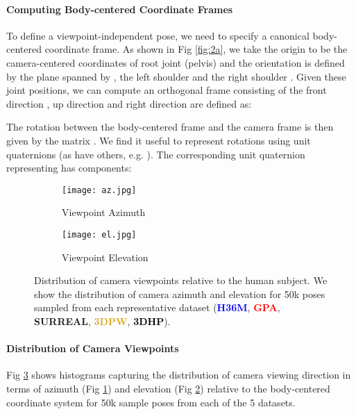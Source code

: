 \documentclass[runningheads]{llncs}
\begin{document}
\paragraph{Computing Body-centered Coordinate Frames}
To define a
viewpoint-independent pose, we need to specify a canonical body-centered
coordinate frame. As shown in Fig \ref{fig:2a}, we take the origin to be the 
camera-centered coordinates of root joint (pelvis)  and
the orientation is defined by the plane spanned by , the left shoulder
 and the right shoulder . Given these joint positions, we can compute
an orthogonal frame consisting of the front direction , up direction  and
right direction  are defined as:

The rotation between the body-centered frame and the camera frame is then given
by the matrix . We find it useful to represent rotations using
unit quaternions (as have others, e.g.
\cite{motionretarget,factored3dTulsiani17}). The corresponding unit quaternion
representing  has components:






\begin{figure}[t]
\begin{center}
\begin{subfigure}{0.48\textwidth}
\texttt{[image: az.jpg]}
\caption{Viewpoint Azimuth} \label{fig:az}
\end{subfigure}
\hspace*{\fill}
\begin{subfigure}{0.48\textwidth} \centering
\texttt{[image: el.jpg]}
\caption{Viewpoint Elevation} \label{fig:el}
\end{subfigure}
\end{center}
   \caption{
   Distribution of camera viewpoints relative to the human subject. 
   We show the distribution of camera azimuth  and
   elevation  for 50k poses sampled from each
   representative dataset
   (\textcolor{blue}{\textbf{H36M}}, \textcolor{red}{\textbf{GPA}},  \textcolor{OliveGreen}{\textbf{SURREAL}},
   \textcolor{Goldenrod}{\textbf{3DPW}}, \textcolor{black}{\textbf{3DHP}}).
} 
\label{fig:view_direction}
\vspace{-0.15in}
\end{figure}


\paragraph{Distribution of Camera Viewpoints}
Fig \ref{fig:view_direction} shows histograms capturing the distribution of
camera viewing direction in terms of azimuth (Fig \ref{fig:az}) and elevation
(Fig \ref{fig:el}) relative to the body-centered coordinate system for 50k
sample poses from each of the 5 datasets.
\end{document}
